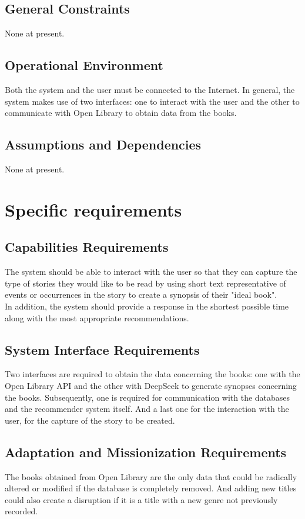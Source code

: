 \documentclass[12pt,a4paper]{article}
\begin{document}
\subsection{General Constraints}
None at present.
\subsection{Operational Environment}
Both the system and the user must be connected to the Internet. In general, 
the system makes use of two interfaces: one to interact with the user and 
the other to communicate with Open Library to obtain data from the books.
\subsection{Assumptions and Dependencies}
None at present.

\section{Specific requirements}
\subsection{Capabilities Requirements}
The system should be able to interact with the user so 
that they can capture the type of stories they would 
like to be read by using short text representative of 
events or occurrences in the story to create a synopsis of their "ideal book".\\
In addition, the system should provide a response in 
the shortest possible time along with the most 
appropriate recommendations.
\subsection{System Interface Requirements}
Two interfaces are required to obtain the data concerning 
the books: one with the Open Library API and the other with 
DeepSeek to generate synopses concerning the books. 
Subsequently, one is required for communication with the 
databases and the recommender system itself. And a last one 
for the interaction with the user, for the capture of the 
story to be created.
\subsection{Adaptation and Missionization Requirements}
The books obtained from Open Library are the only data 
that could be radically altered or modified if the database 
is completely removed. And adding new titles could also 
create a disruption if it is a title with a new genre not previously recorded.
\end{document}
